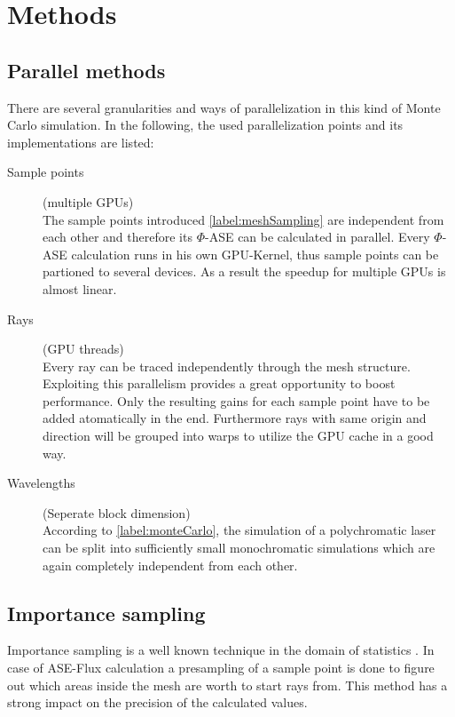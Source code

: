 \section{Methods}
\subsection{Parallel methods}
There are several granularities and ways of parallelization in this kind of 
Monte Carlo simulation. In the following, the used parallelization points and
its implementations are listed:

\begin{description}

  \item[Sample points] (multiple GPUs)\\
    The sample points introduced \ref{label:meshSampling} are independent from each other
    and therefore its $\Phi$-ASE can be calculated in parallel. Every $\Phi$-ASE
    calculation runs in his own GPU-Kernel, thus sample points can be partioned 
    to several devices. As a result the speedup for multiple GPUs is almost linear.

  \item[Rays] (GPU threads)\\
    Every ray can be traced independently through the mesh structure.
    Exploiting this parallelism provides a great opportunity to boost
    performance. Only the resulting gains for each sample point have to be
    added atomatically in the end.
    Furthermore rays with same origin and direction will be grouped
    into warps to utilize the GPU cache in a good way.

  \item[Wavelengths] (Seperate block dimension)\\
    According to \ref{label:monteCarlo}, the simulation of a polychromatic
    laser can be split into sufficiently small monochromatic simulations which
    are again completely independent from each other.

\end{description}

\subsection{Importance sampling}
Importance sampling is a well known technique in the domain
of statistics \cite{importanceSamplingSource}. In case of 
ASE-Flux calculation a presampling of a sample point is done
to figure out which areas inside the mesh are worth to start rays from.
This method has a strong impact on the precision of the
calculated values. 

